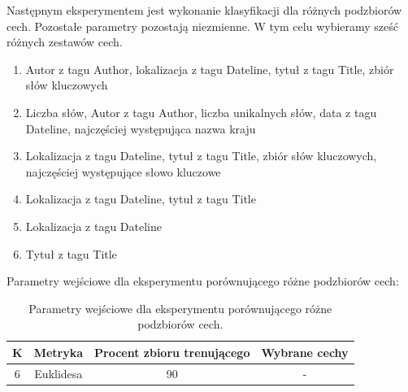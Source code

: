\documentclass{classrep}
\begin{document}
Następnym eksperymentem jest wykonanie klasyfikacji dla różnych podzbiorów cech. Pozostałe parametry pozostają niezmienne. W tym celu wybieramy sześć różnych zestawów cech. 

\begin{enumerate}
\item Autor z tagu Author, lokalizacja z tagu Dateline, tytuł z tagu Title, zbiór słów kluczowych
\item Liczba słów, Autor z tagu Author, liczba unikalnych słów, data z tagu Dateline, najczęściej występująca nazwa kraju
\item Lokalizacja z tagu Dateline, tytuł z tagu Title, zbiór słów kluczowych, najczęściej występujące słowo kluczowe
\item Lokalizacja z tagu Dateline, tytuł z tagu Title
\item Lokalizacja z tagu Dateline
\item Tytuł z tagu Title
\end{enumerate}

Parametry wejściowe dla eksperymentu porównującego różne podzbiorów cech:
 
\begin{table}[h!]
\caption{Parametry wejściowe dla eksperymentu porównującego różne podzbiorów cech. }
\centering
\vspace{0.1cm}
 \begin{tabular}{c c c c}
    \textbf{K} & \textbf{Metryka}   & \textbf{Procent zbioru trenującego}  & \textbf{Wybrane cechy}   \\
\hline
6 & Euklidesa & 90 & -\\
\end {tabular}
\label {Parametry wejściowe dla eksperymentu porównującego różne podzbiorów cech. }
\end{table}
\end{document}
